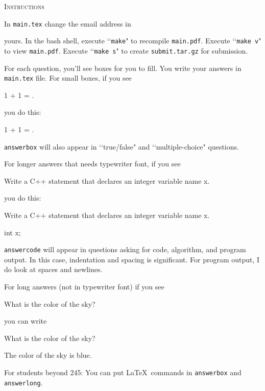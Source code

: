 \textsc{Instructions}

In \verb!main.tex! change the email address in
\begin{console}
\renewcommand\AUTHOR{jdoe5@cougars.ccis.edu} 
\end{console}
yours.
In the bash shell, execute \lq\lq \verb!make!" to recompile \verb!main.pdf!.
Execute \lq\lq \verb!make v!" to view \verb!main.pdf!.
Execute \lq\lq \verb!make s!" to create \verb!submit.tar.gz! for submission.

For each question, you'll see boxes for you to fill.
You write your answers in \verb!main.tex! file.
For small boxes, if you see
\begin{console}[frame=single=single,fontsize=\small]
1 + 1 = \answerbox{}.
\end{console}
you do this:
\begin{console}[frame=single=single,fontsize=\small]
1 + 1 = .
\end{console}
\verb!answerbox! will also appear in
\lq\lq true/false" and \lq\lq multiple-choice"
questions.

For longer answers that needs typewriter font, if you see
\begin{console}[frame=single=single, fontsize=\small]
Write a C++ statement that declares an integer variable name x.
\begin{answercode}
\end{answercode}
\end{console}
you do this:
\begin{console}[frame=single=single, fontsize=\small]
Write a C++ statement that declares an integer variable name x.
\begin{answercode}
int x;
\end{answercode}
\end{console}
\verb!answercode! will appear in questions asking for
code, algorithm, and program output.
In this case, indentation and spacing is significant.
For program output, I do look at spaces and newlines.

For long answers (not in typewriter font) if you see
\begin{console}[frame=single=single, fontsize=\small]
What is the color of the sky?
\begin{answerlong}
\end{answerlong}
\end{console}
you can write
\begin{console}[frame=single=single, fontsize=\small]
What is the color of the sky?
\begin{answerlong}
The color of the sky is blue.
\end{answerlong}
\end{console}
For students beyond 245: You can put \LaTeX\ commands in
\verb!answerbox! and 
\verb!answerlong!.

